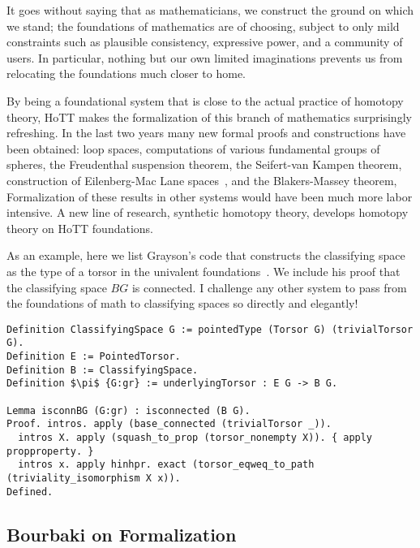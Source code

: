 \documentclass[brochure,english,12pt]{bourbaki}
\theoremstyle{plain}
\begin{document}
It goes without saying that as mathematicians, we construct the ground on which we stand;
the foundations of mathematics are of choosing, subject
to only mild constraints such as plausible consistency, expressive power, and a community of users.
In particular, nothing but our own limited imaginations prevents us from relocating the
foundations much closer to home.

By being a foundational system that is close to the actual practice of homotopy theory,
HoTT makes the formalization of this branch of mathematics surprisingly refreshing.
In the last two years many new formal proofs and constructions have been obtained: 
loop spaces, computations of various
fundamental groups of spheres, the Freudenthal suspension theorem,
the Seifert-van Kampen theorem,
construction of Eilenberg-Mac Lane spaces~\cite{licataeilenberg}, and the Blakers-Massey theorem,
Formalization of these results in other systems would have been much more labor intensive.
A new line of research, synthetic homotopy theory, develops homotopy theory on HoTT foundations.

As an example, 
here we list Grayson's code that constructs the classifying space as the type of a torsor in the univalent
foundations~\cite{Ktheory}.  We include his proof that the classifying space $BG$ is connected.
I challenge any other system to pass from the foundations of math to classifying spaces so directly and elegantly!


\begin{lstlisting}[keepspaces=true,stringstyle=\tt,basicstyle=\small,frame=single,framesep=8pt,mathescape,morekeywords={Definition,Lemma,Proof,Defined},columns=flexible]
Definition ClassifyingSpace G := pointedType (Torsor G) (trivialTorsor G).
Definition E := PointedTorsor.
Definition B := ClassifyingSpace.
Definition $\pi$ {G:gr} := underlyingTorsor : E G -> B G.

Lemma isconnBG (G:gr) : isconnected (B G).
Proof. intros. apply (base_connected (trivialTorsor _)).
  intros X. apply (squash_to_prop (torsor_nonempty X)). { apply propproperty. }
  intros x. apply hinhpr. exact (torsor_eqweq_to_path (triviality_isomorphism X x)). 
Defined.
\end{lstlisting}





\subsection{Bourbaki on Formalization}
\end{document}
